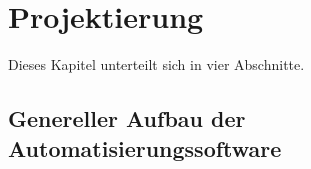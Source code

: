 \documentclass[../Bachelorarbeit.tex]{subfiles}
\begin{document}
\section{Projektierung}
Dieses Kapitel unterteilt sich in vier Abschnitte.

\subsection{Genereller Aufbau der Automatisierungssoftware}
\blindtext[1]
\end{document}
